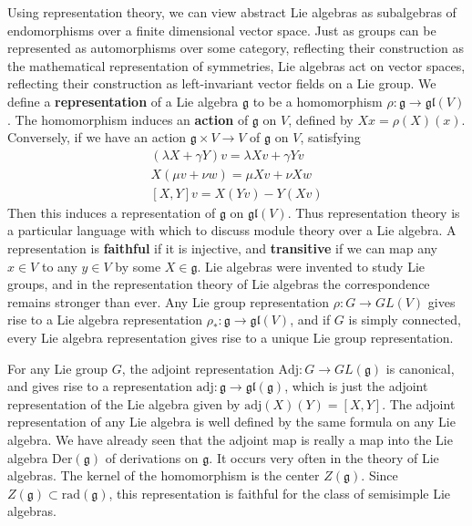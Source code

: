 Using representation theory, we can view abstract Lie algebras as subalgebras of endomorphisms over a finite dimensional vector space. Just as groups can be represented as automorphisms over some category, reflecting their construction as the mathematical representation of symmetries, Lie algebras act on vector spaces, reflecting their construction as left-invariant vector fields on a Lie group. We define a {\bf representation} of a Lie algebra $\mathfrak{g}$ to be a homomorphism $\rho: \mathfrak{g} \to \mathfrak{gl}(V)$. The homomorphism induces an {\bf action} of $\mathfrak{g}$ on $V$, defined by $Xx = \rho(X)(x)$. Conversely, if we have an action $\mathfrak{g} \times V \to V$ of $\mathfrak{g}$ on $V$, satisfying
%
\begin{align*}
    (\lambda X + \gamma Y)v = \lambda Xv + \gamma Yv\\
    X(\mu v + \nu w) = \mu Xv + \nu Xw\\
    [X,Y] v = X(Yv) - Y(Xv)
\end{align*}
%
Then this induces a representation of $\mathfrak{g}$ on $\mathfrak{gl}(V)$. Thus representation theory is a particular language with which to discuss module theory over a Lie algebra. A representation is {\bf faithful} if it is injective, and {\bf transitive} if we can map any $x \in V$ to any $y \in V$ by some $X \in \mathfrak{g}$. Lie algebras were invented to study Lie groups, and in the representation theory of Lie algebras the correspondence remains stronger than ever. Any Lie group representation $\rho: G \to GL(V)$ gives rise to a Lie algebra representation $\rho_*: \mathfrak{g} \to \mathfrak{gl}(V)$, and if $G$ is simply connected, every Lie algebra representation gives rise to a unique Lie group representation.

\begin{example}
    For any Lie group $G$, the adjoint representation $\text{Adj}: G \to GL(\mathfrak{g})$ is canonical, and gives rise to a representation $\text{adj}: \mathfrak{g} \to \mathfrak{gl}(\mathfrak{g})$, which is just the adjoint representation of the Lie algebra given by $\text{adj}(X)(Y) = [X,Y]$. The adjoint representation of any Lie algebra is well defined by the same formula on any Lie algebra. We have already seen that the adjoint map is really a map into the Lie algebra $\text{Der}(\mathfrak{g})$ of derivations on $\mathfrak{g}$. It occurs very often in the theory of Lie algebras. The kernel of the homomorphism is the center $Z(\mathfrak{g})$. Since $Z(\mathfrak{g}) \subset \text{rad}(\mathfrak{g})$, this representation is faithful for the class of semisimple Lie algebras.
\end{example}

